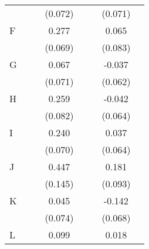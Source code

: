 \begin{longtable}{l*{3}{c}|l*{3}{c}}
	&                     &                     &     (0.072)         &                     &                     &     (0.071)         \\
	F                   &                     &                     &       0.277\sym{***}&                     &                     &       0.065         \\
	&                     &                     &     (0.069)         &                     &                     &     (0.083)         \\
	G                   &                     &                     &       0.067         &                     &                     &      -0.037         \\
	&                     &                     &     (0.071)         &                     &                     &     (0.062)         \\
	H                   &                     &                     &       0.259\sym{***}&                     &                     &      -0.042         \\
	&                     &                     &     (0.082)         &                     &                     &     (0.064)         \\
	I                   &                     &                     &       0.240\sym{***}&                     &                     &       0.037         \\
	&                     &                     &     (0.070)         &                     &                     &     (0.064)         \\
	J                   &                     &                     &       0.447\sym{***}&                     &                     &       0.181\sym{*}  \\
	&                     &                     &     (0.145)         &                     &                     &     (0.093)         \\
	K                   &                     &                     &       0.045         &                     &                     &      -0.142\sym{**} \\
	&                     &                     &     (0.074)         &                     &                     &     (0.068)         \\
	L                   &                     &                     &       0.099         &                     &                     &       0.018         \\

\end{longtable}
